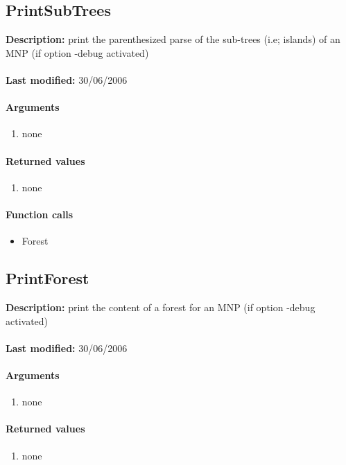 \subsection{PrintSubTrees}
\textbf{Description:} print the parenthesized parse of the sub-trees (i.e; islands) of an MNP (if option -debug activated)\\
\\\textbf{Last modified:} 30/06/2006

\paragraph{Arguments}
\begin{enumerate}
\item none
\end{enumerate}

\paragraph{Returned values}
\begin{enumerate}
\item none
\end{enumerate}

\paragraph{Function calls}
\begin{itemize}
\item Forest
\end{itemize}

\subsection{PrintForest}
\textbf{Description:} print the content of a forest for an MNP (if option -debug activated)\\
\\\textbf{Last modified:} 30/06/2006

\paragraph{Arguments}
\begin{enumerate}
\item none
\end{enumerate}

\paragraph{Returned values}
\begin{enumerate}
\item none
\end{enumerate}

